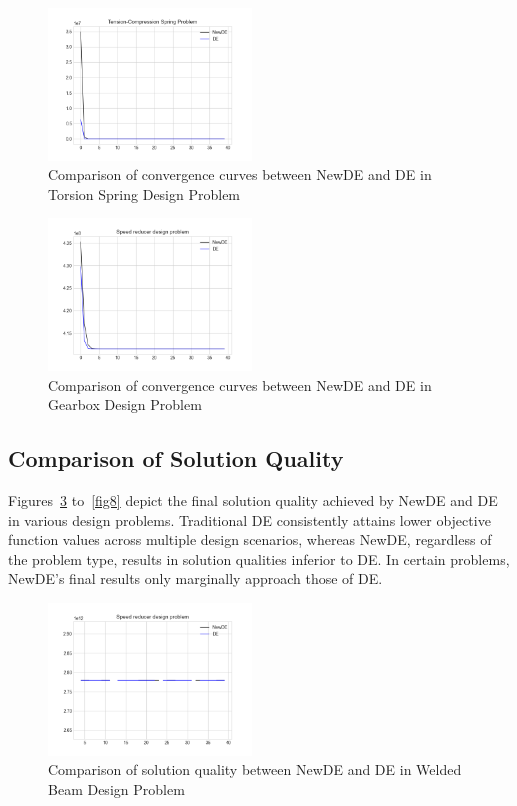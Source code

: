 \documentclass[conference]{IEEEtran}
\begin{document}
\begin{figure}[H]
    \centering
    \includegraphics[width=0.48\textwidth]{3Figure_1.png}
    \caption{Comparison of convergence curves between NewDE and DE in Torsion Spring Design Problem}
    \label{fig3}
\end{figure}

\begin{figure}[H]
    \centering
    \includegraphics[width=0.48\textwidth]{4Figure_1.png}
    \caption{Comparison of convergence curves between NewDE and DE in Gearbox Design Problem}
    \label{fig4}
\end{figure}

\subsection{Comparison of Solution Quality}

Figures~\ref{fig5} to~\ref{fig8} depict the final solution quality achieved by NewDE and DE in various design problems. Traditional DE consistently attains lower objective function values across multiple design scenarios, whereas NewDE, regardless of the problem type, results in solution qualities inferior to DE. In certain problems, NewDE's final results only marginally approach those of DE.

\begin{figure}[H]
    \centering
    \includegraphics[width=0.48\textwidth]{5Figure_1.png}
    \caption{Comparison of solution quality between NewDE and DE in Welded Beam Design Problem}
    \label{fig5}
\end{figure}
\end{document}
